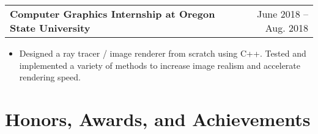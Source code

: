 \documentclass[a4paper,12pt]{article}
\makeatletter
\newenvironment{joblong}[2]
    {
    \begin{tabularx}{\linewidth}{@{}l X r@{}}
    \textbf{#1} & \hfill &  #2 \\[3.75pt]
    \end{tabularx}
    \begin{minipage}[t]{\linewidth}
    \begin{itemize}[nosep,after=\strut, leftmargin=2em, itemsep=3pt,label=--]
    }
    {
    \end{itemize}
    \end{minipage}    
    }
\makeatother
\begin{document}
\begin{adjustwidth}{0.7em}{0pt}
\begin{joblong}{Computer Graphics Internship at Oregon State University}{June 2018 – Aug. 2018}
\item Designed a ray tracer / image renderer from scratch using C++. Tested and implemented a variety of methods to increase image realism and accelerate rendering speed.
\end{joblong}

\end{adjustwidth}

\section{Honors, Awards, and Achievements}
\begin{adjustwidth}{0.7em}{0pt}


\end{adjustwidth}
\end{document}
